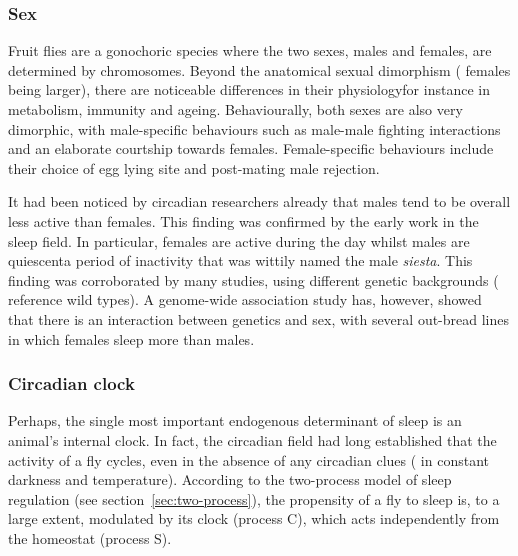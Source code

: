 


\subsubsection{Sex}
Fruit flies are a gonochoric species where the two sexes, males and females, are determined by chromosomes.
Beyond the anatomical sexual dimorphism (\eg{} females being larger), there are noticeable differences in their physiology\emd{}for instance in metabolism, immunity\cite{hill-burns_x-linked_2009} and ageing\cite{chandegra_sexually_2017}. 
Behaviourally, both sexes are also very dimorphic, with male-specific behaviours such as male-male fighting interactions and an elaborate courtship towards females. Female-specific behaviours include their choice of egg lying site\cite{yang_drosophila_2008} and post-mating male rejection\cite{connolly_rejection_1973}.

It had been noticed by circadian researchers already that males tend to be overall less active than females.
This finding was confirmed by the early work in the sleep field. 
In particular, females are active during the day whilst males are quiescent\emd{}a period of inactivity that was wittily named the male \emph{siesta}.
This finding was corroborated by many studies, using different genetic backgrounds (\ie{} reference wild types).
A genome-wide association study has, however, showed that there is an interaction between genetics and sex, with several out-bread lines in which females sleep more than males\cite{harbison_genome-wide_2013}.


\subsubsection{Circadian clock}
Perhaps, the single most important endogenous determinant of sleep is an animal's internal clock.
In fact, the circadian field had long established that the activity of a fly cycles, even in the absence of any circadian clues (\ie{} in constant darkness and temperature).
According to the two-process model of sleep regulation (see section~\ref{sec:two-process}), the propensity of a fly to sleep is, to a large extent, modulated by its clock (process C), which acts independently from the homeostat (process S)\cite{dubowy_circadian_2017}.

